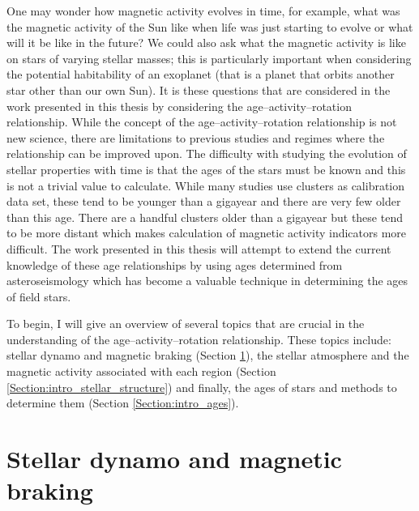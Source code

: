 One may wonder how magnetic activity evolves in time, for example, what was the magnetic activity of the Sun like when life was just starting to evolve or what will it be like in the future? We could also ask what the magnetic activity is like on stars of varying stellar masses; this is particularly important when considering the potential habitability of an exoplanet (that is a planet that orbits another star other than our own Sun). It is these questions that are considered in the work presented in this thesis by considering the age--activity--rotation relationship. While the concept of the age--activity--rotation relationship is not new science, there are limitations to previous studies and regimes where the relationship can be improved upon. The difficulty with studying the evolution of stellar properties with time is that the ages of the stars must be known and this is not a trivial value to calculate. While many studies use clusters as calibration data set, these tend to be younger than a gigayear and there are very few older than this age. There are a handful clusters older than a gigayear but these tend to be more distant which makes calculation of magnetic activity indicators more difficult. The work presented in this thesis will attempt to extend the current knowledge of these age relationships by using ages determined from asteroseismology which has become a valuable technique in determining the ages of field stars.

To begin, I will give an overview of several topics that are crucial in the understanding of the age--activity--rotation relationship. These topics include: stellar dynamo and magnetic braking (Section \ref{Section:intro_dynamo_and_braking_section}), the stellar atmosphere and the magnetic activity associated with each region (Section \ref{Section:intro_stellar_structure}) and finally, the ages of stars and methods to determine them (Section \ref{Section:intro_ages}).

\section{Stellar dynamo and magnetic braking}
\label{Section:intro_dynamo_and_braking_section}

